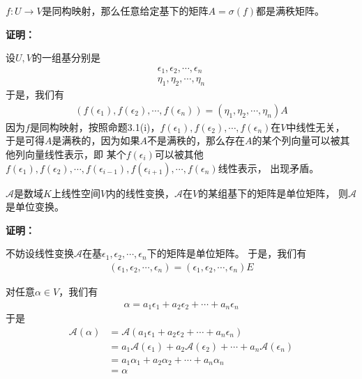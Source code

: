 \documentclass{article}
\begin{document}
\begin{zremark}
  $f: U \to V$是同构映射，那么任意给定基下的矩阵$A = \sigma(f)$都是满秩矩阵。
\end{zremark}

\textbf{证明：}

设$U, V$的一组基分别是
\begin{align*}
  \epsilon_1, \epsilon_2, \cdots, \epsilon_n \\
  \eta_1, \eta_2, \cdots, \eta_n
\end{align*}
于是，我们有
\begin{align*}
  (f(\epsilon_1), f(\epsilon_2), \cdots, f(\epsilon_n)) = (\eta_1, \eta_2, \cdots, \eta_n) A
\end{align*}
因为$f$是同构映射，按照命题3.1(i)，$f(\epsilon_1), f(\epsilon_2), \cdots, f(\epsilon_n)$在$V$中线性无关，
于是可得$A$是满秩的，因为如果$A$不是满秩的，那么存在$A$的某个列向量可以被其他列向量线性表示，即
某个$f(\epsilon_i)$可以被其他
$f(\epsilon_1), f(\epsilon_2), \cdots, f(\epsilon_{i-1}), f(\epsilon_{i+1}), \cdots, f(\epsilon_n)$线性表示，
出现矛盾。

\begin{zremark}
  $\mathscr{A}$是数域$K$上线性空间$V$内的线性变换，$\mathscr{A}$在$V$的某组基下的矩阵是单位矩阵，
  则$\mathscr{A}$是单位变换。
\end{zremark}

\textbf{证明：}

不妨设线性变换$\mathscr{A}$在基$\epsilon_1, \epsilon_2, \cdots, \epsilon_n$下的矩阵是单位矩阵。
于是，我们有
\begin{align*}
  (\epsilon_1, \epsilon_2, \cdots, \epsilon_n) = (\epsilon_1, \epsilon_2, \cdots, \epsilon_n) E
\end{align*}

对任意$\alpha \in V$，我们有
\begin{align*}
  \alpha = a_1 \epsilon_1 + a_2 \epsilon_2 + \cdots + a_n \epsilon_n
\end{align*}
于是
\begin{align*}
  \mathscr{A} (\alpha) & = \mathscr{A} (a_1 \epsilon_1 + a_2 \epsilon_2 + \cdots + a_n \epsilon_n)                             \\
                       & = a_1 \mathscr{A} (\epsilon_1) + a_2 \mathscr{A} (\epsilon_2) + \cdots + a_n \mathscr{A} (\epsilon_n) \\
                       & = a_1 \alpha_1 + a_2 \alpha_2 + \cdots + a_n \alpha_n                                                 \\
                       & = \alpha
\end{align*}
\end{document}
